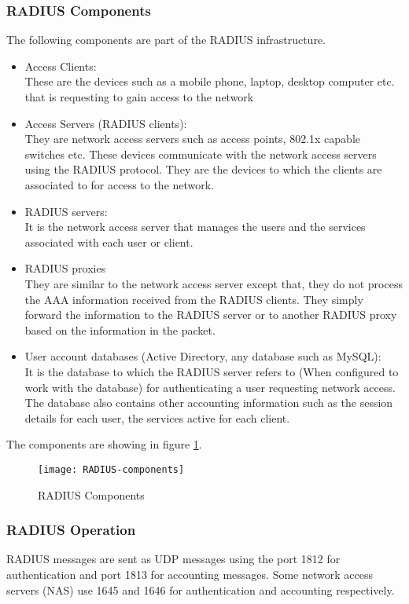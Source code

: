 \subsubsection{RADIUS Components \cite{RADIUS_components}} \label{RADIUS_components}
The following components are part of the RADIUS infrastructure.
\begin{itemize}
	\item Access Clients:
	\\ These are the devices such as a mobile phone, laptop, desktop computer etc. that is requesting to gain access to the network 
	\item Access Servers (RADIUS clients):
	\\ They are network access servers such as access points, 802.1x capable switches etc. These devices communicate with the network access servers using the RADIUS protocol. They are the devices to which the clients are associated to for access to the network.
	\item RADIUS servers:
	\\ It is the network access server that manages the users and the services associated with each user or client.
	\item RADIUS proxies
	\\ They are similar to the network access server except that, they do not process the AAA information received from the RADIUS clients. They simply forward the information to the RADIUS server or to another RADIUS proxy based on the information in the packet.
	\item User account databases (Active Directory, any database such as MySQL):
	\\ It is the database to which the RADIUS server refers to (When configured to work with the database) for authenticating a user requesting network access. The database also contains other accounting information such as the session details for each user, the services active for each client. 
	
\end{itemize}
The components are showing in figure \ref{fig:RADIUS_components_img}.

\begin{figure}
	\centering
	\texttt{[image: RADIUS-components]}
	\caption {RADIUS Components \cite{RADIUS_components_img}}
	\label{fig:RADIUS_components_img}
	\vspace{-10pt}
\end{figure}
\subsubsection{RADIUS Operation \cite{RADIUS_components}} \label{RADIUS_Operations}
RADIUS messages are sent as UDP messages using the port 1812 for authentication and port 1813 for accounting messages. Some network access servers (NAS) use 1645 and 1646 for authentication and accounting respectively.

